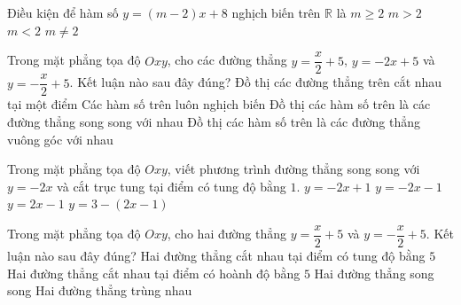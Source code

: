 \begin{bt}%
	Điều kiện để hàm số $y=(m-2)x+8$ nghịch biến trên $\mathbb{R}$ là
	\choice
	{$m\geq 2$}
	{$m>2$}
	{\True $m<2$}
	{$m\neq 2$}
\end{bt}
\begin{bt}%
	Trong mặt phẳng tọa độ $Oxy$, cho các đường thẳng $y=\dfrac{x}{2}+5$, $y=-2x+5$ và $y=-\dfrac{x}{2}+5$. Kết luận nào sau đây đúng?
	\choice
	{\True Đồ thị các đường thẳng trên cắt nhau tại một điểm}
	{Các hàm số trên luôn nghịch biến}
	{Đồ thị các hàm số trên là các đường thẳng song song với nhau}
	{Đồ thị các hàm số trên là các đường thẳng vuông góc với nhau}
\end{bt}
\begin{bt}%
	Trong mặt phẳng tọa độ $Oxy$, viết phương trình đường thẳng song song với $y=-2x$ và cắt trục tung tại điểm có tung độ bằng $1$.
	\choice
	{\True $y=-2x+1$}
	{$y=-2x-1$}
	{$y=2x-1$}
	{$y=3-(2x-1)$}
\end{bt}
\begin{bt}%
	Trong mặt phẳng tọa độ $Oxy$, cho hai đường thẳng $y=\dfrac{x}{2}+5$ và $y=-\dfrac{x}{2}+5$. Kết luận nào sau đây đúng?
	\choice
	{\True Hai đường thẳng cắt nhau tại điểm có tung độ bằng $5$}
	{Hai đường thẳng cắt nhau tại điểm có hoành độ bằng $5$}
	{Hai đường thẳng song song}
	{Hai đường thẳng trùng nhau}
\end{bt}
